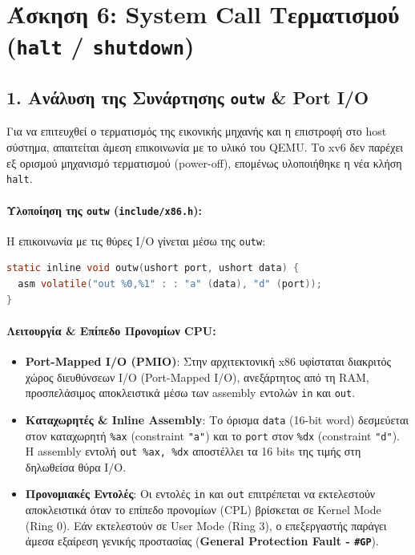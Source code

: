 \documentclass[11pt,a4paper]{article}
\begin{document}
\clearpage
\section{Άσκηση 6: System Call Τερματισμού (\texttt{halt} / \texttt{shutdown})}

\subsection*{1. Ανάλυση της Συνάρτησης \texttt{outw} \& Port I/O}
Για να επιτευχθεί ο τερματισμός της εικονικής μηχανής και η επιστροφή στο host σύστημα, απαιτείται άμεση επικοινωνία με το υλικό του QEMU. 
Το xv6 δεν παρέχει εξ ορισμού μηχανισμό τερματισμού (power-off), επομένως υλοποιήθηκε η νέα κλήση \texttt{halt}.

\paragraph{Υλοποίηση της \texttt{outw} (\texttt{include/x86.h}):}
Η επικοινωνία με τις θύρες I/O γίνεται μέσω της \texttt{outw}:

\begin{lstlisting}[language=C, caption={Υλοποίηση της outw στο include/x86.h}]
static inline void outw(ushort port, ushort data) {
  asm volatile("out %0,%1" : : "a" (data), "d" (port));
}
\end{lstlisting}

\paragraph{Λειτουργία \& Επίπεδο Προνομίων CPU:}
\begin{itemize}
    \item \textbf{Port-Mapped I/O (PMIO)}: Στην αρχιτεκτονική x86 υφίσταται διακριτός χώρος διευθύνσεων I/O (Port-Mapped I/O), ανεξάρτητος από τη RAM, 
    προσπελάσιμος αποκλειστικά μέσω των assembly εντολών \texttt{in} και \texttt{out}.
    \item \textbf{Καταχωρητές \& Inline Assembly}: Το όρισμα \texttt{data} (16-bit word) δεσμεύεται στον καταχωρητή \texttt{\%ax} 
    (constraint \texttt{"a"}) και το \texttt{port} στον \texttt{\%dx} (constraint \texttt{"d"}). 
    Η assembly εντολή \texttt{out \%ax, \%dx} αποστέλλει τα 16 bits της τιμής στη δηλωθείσα θύρα I/O.
    \item \textbf{Προνομιακές Εντολές}: Οι εντολές \texttt{in} και \texttt{out} επιτρέπεται να εκτελεστούν αποκλειστικά όταν το επίπεδο προνομίων (CPL) βρίσκεται σε Kernel Mode (Ring 0). 
    Εάν εκτελεστούν σε User Mode (Ring 3), ο επεξεργαστής παράγει άμεσα εξαίρεση γενικής προστασίας (\textbf{General Protection Fault - \texttt{\#GP}}).
\end{itemize}
\end{document}
